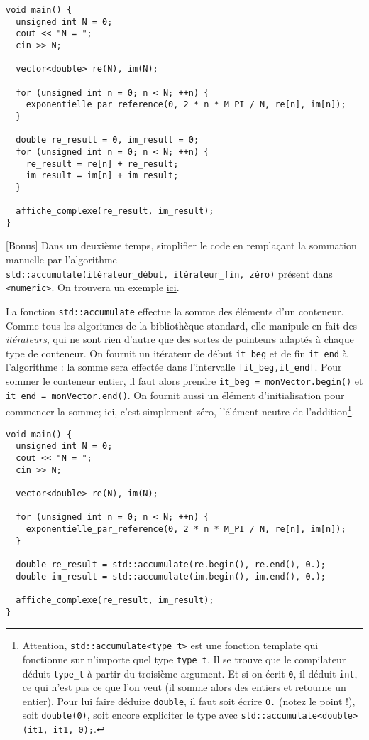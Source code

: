 \documentclass{book}
\newcommand{\inline}[1]{\texttt{#1}}
\begin{document}
\begin{correction}
\begin{verbatim}
void main() {
  unsigned int N = 0;
  cout << "N = ";
  cin >> N;

  vector<double> re(N), im(N);

  for (unsigned int n = 0; n < N; ++n) {
    exponentielle_par_reference(0, 2 * n * M_PI / N, re[n], im[n]);
  }

  double re_result = 0, im_result = 0;
  for (unsigned int n = 0; n < N; ++n) {
    re_result = re[n] + re_result;
    im_result = im[n] + im_result;
  }

  affiche_complexe(re_result, im_result);
}
\end{verbatim}
\end{correction}

\vspace{1em}
[Bonus] Dans un deuxième temps, simplifier le code en remplaçant la sommation manuelle par l'algorithme\\ \inline{std::accumulate(itérateur_début, itérateur_fin, zéro)} présent dans \inline{<numeric>}. On trouvera un exemple \href{https://en.cppreference.com/w/cpp/algorithm/accumulate}{ici}.

\begin{correction}
La fonction \inline{std::accumulate} effectue la somme des éléments d'un conteneur. Comme tous les algoritmes de la bibliothèque standard, elle manipule en fait des \emph{itérateurs}, qui ne sont rien d'autre que des sortes de pointeurs adaptés à chaque type de conteneur. On fournit un itérateur de début \texttt{it\_beg} et de fin \texttt{it\_end} à l'algorithme : la somme sera effectée dans l'intervalle \texttt{[it\_beg,it\_end[}. Pour sommer le conteneur entier, il faut alors prendre \inline{it_beg = monVector.begin()} et \inline{it_end = monVector.end()}. On fournit aussi un élément d'initialisation pour commencer la somme; ici, c'est simplement zéro, l'élément neutre de l'addition\footnote{Attention, \inline{std::accumulate<type_t>} est une fonction template qui fonctionne sur n'importe quel type \inline{type_t}. Il se trouve que le compilateur déduit \inline{type_t} à partir du troisième argument. Et si on écrit \inline{0}, il déduit \inline{int}, ce qui n'est pas ce que l'on veut (il somme alors des entiers et retourne un entier). Pour lui faire déduire \inline{double}, il faut soit écrire \inline{0.} (notez le point !), soit \inline{double(0)}, soit encore expliciter le type avec \inline{std::accumulate<double>(it1, it1, 0);}.}.

\begin{verbatim}
void main() {
  unsigned int N = 0;
  cout << "N = ";
  cin >> N;

  vector<double> re(N), im(N);

  for (unsigned int n = 0; n < N; ++n) {
    exponentielle_par_reference(0, 2 * n * M_PI / N, re[n], im[n]);
  }

  double re_result = std::accumulate(re.begin(), re.end(), 0.);
  double im_result = std::accumulate(im.begin(), im.end(), 0.);

  affiche_complexe(re_result, im_result);
}
\end{verbatim}
\end{correction}
\end{document}
